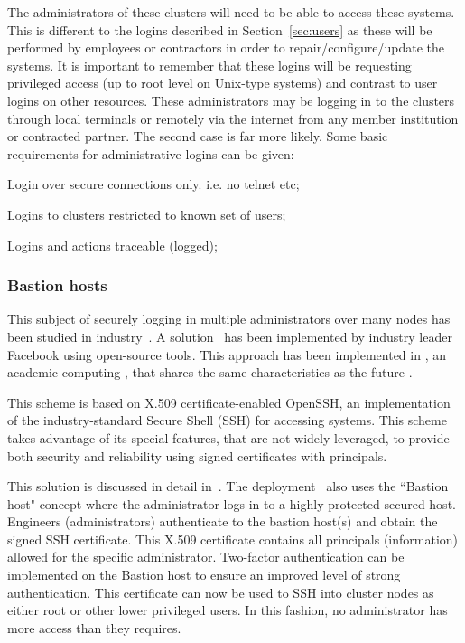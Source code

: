 \documentclass[12pt,a4paper]{article}
\begin{document}
The administrators of these clusters will need to be able to access these systems.
This is different to the logins described in Section~\ref{sec:users} as these will be performed by \EC employees or contractors
in order to repair/configure/update the systems.
It is important to remember that these logins will be requesting privileged access (up to root level on Unix-type systems) and contrast to user logins on other \einfra resources.
These administrators may be logging in to the clusters through local terminals or remotely via the internet from any \EC member institution
or contracted partner.
The second case is far more likely.
Some basic requirements for administrative logins can be given:
\bitm
\item Login over secure connections only. i.e. no telnet etc;
\item Logins to clusters restricted to known set of users;
\item Logins and actions traceable (logged);
\eitm

\subsubsection{Bastion hosts}
\label{ssec:bastion}

This subject of securely logging in multiple administrators over many nodes has been studied in industry~\cite{secure-ssh}.
A solution~\cite{fb-ssh} has been implemented by industry leader Facebook using open-source tools.
This approach has been implemented in \nnt, an academic computing \einfra, that shares the same characteristics as the future \ED \einfra.

This scheme is based on X.509 certificate-enabled OpenSSH, an implementation of the industry-standard Secure Shell (SSH) for accessing systems.
This scheme takes advantage of its special features, that are not widely leveraged, to provide both security and reliability using signed certificates with principals.

This solution is discussed in detail in~\cite{fb-ssh}.
The \nnt deployment~\cite{nt1-ssh} also uses the ``Bastion host" concept where the administrator logs in to a highly-protected secured host.
Engineers (administrators) authenticate to the bastion host(s) and obtain the signed SSH certificate.
This X.509 certificate contains all principals (information) allowed for the specific administrator. 
Two-factor authentication can be implemented on the Bastion host to ensure an improved level of strong authentication.
This certificate can now be used to SSH into cluster nodes as either root or other lower privileged users.
In this fashion, no administrator has more access than they requires.
\end{document}

